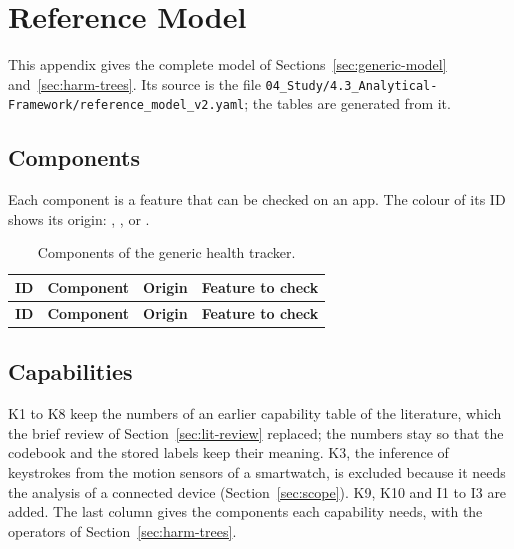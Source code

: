 \chapter{Reference Model}
\label{app:reference-model}

This appendix gives the complete model of Sections~\ref{sec:generic-model}
and~\ref{sec:harm-trees}. Its source is the file
\texttt{04\_Study/4.3\_Analytical-Framework/reference\_model\_v2.yaml}; the tables are generated from it.

\section{Components}
Each component is a feature that can be checked on an app. The colour of its ID shows its origin:
, ,  or .

{\footnotesize
\begin{longtable}{@{}lp{4.1cm}p{1.9cm}p{6.1cm}@{}}
\caption[Components of the generic health tracker]{Components of the generic health tracker.}
\label{tab:reference-components}\\
\toprule
\textbf{ID} & \textbf{Component} & \textbf{Origin} & \textbf{Feature to check} \\
\midrule
\endfirsthead
\toprule
\textbf{ID} & \textbf{Component} & \textbf{Origin} & \textbf{Feature to check} \\
\midrule
\endhead
\end{longtable}}

\section{Capabilities}
K1 to K8 keep the numbers of an earlier capability table of the literature, which the brief
review of Section~\ref{sec:lit-review} replaced; the numbers stay so that the codebook and the
stored labels keep their meaning. K3, the inference of keystrokes from the motion sensors of a
smartwatch, is excluded because it needs the analysis of a connected device
(Section~\ref{sec:scope}). K9, K10 and I1 to I3 are added. The last column gives the components each capability needs, with the operators
of Section~\ref{sec:harm-trees}.

